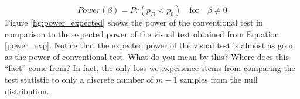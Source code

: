 \documentclass{article}
\newcommand{\green}[1]{{\color{green} #1}} %
\newtheorem{thm}{Theorem}[section]
\begin{document}
\begin{equation}\label{power_exp} 
   Power(\beta)=Pr(p_{D} < p_0)  \quad \text{for}  \quad \beta \ne 0
\end{equation}
Figure \ref{fig:power_expected} shows the power of the conventional test in comparison to the expected power of the visual test obtained from Equation \ref{power_exp}. Notice that the expected power of the visual test is almost as good as the power of conventional test. \green{What do you mean by this? Where does this ``fact'' come from?} In fact, the only loss we experience stems from comparing the test statistic to only a discrete number of  $m-1$ samples from the null distribution. 

% 
%
%
%
%
%
\end{document}

